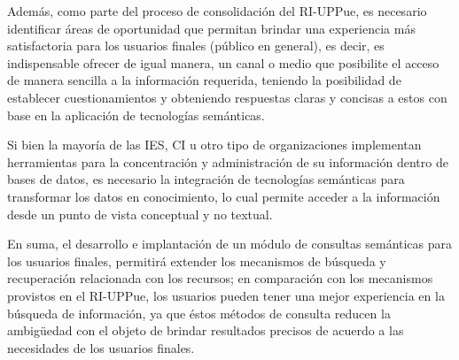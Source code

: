 Además, como parte del proceso de consolidación del RI-UPPue, es necesario identificar áreas de oportunidad que permitan brindar una experiencia más satisfactoria para los usuarios finales (público en general), es decir, es indispensable ofrecer de igual manera, un canal o medio que posibilite el acceso de manera sencilla a la información requerida, teniendo la posibilidad de establecer cuestionamientos y obteniendo respuestas claras y concisas a estos con base en la aplicación de tecnologías semánticas.\newline

Si bien la mayoría de las IES, CI u otro tipo de organizaciones implementan herra\-mi\-en\-tas para la concentración y administración de su información dentro de bases de datos, es necesario la integración de tecnologías semánticas para transformar los datos en conocimiento, lo cual permite acceder a la información desde un punto de vista conceptual y no textual.\newline

En suma, el desarrollo e implantación de un módulo de consultas semánticas para los usuarios finales, permitirá extender los mecanismos de búsqueda y recuperación relacionada con los recursos; en comparación con los mecanismos provistos en el RI-UPPue, los usuarios pueden tener una mejor experiencia en la búsqueda de información, ya que éstos métodos de consulta reducen la ambigüedad con el objeto de brindar resultados precisos de acuerdo a las necesidades de los usuarios finales.\newline



